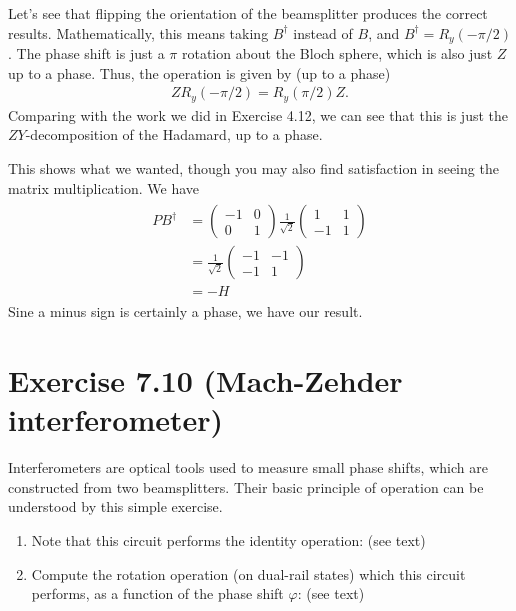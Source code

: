 \documentclass{book}
\begin{document}
    Let's see that flipping the orientation of the beamsplitter produces the correct results. Mathematically, this means taking $B^\dagger$ instead of $B$, and $B^\dagger = R_y(-\pi/2)$. The phase shift is just a $\pi$ rotation about the Bloch sphere, which is also just $Z$ up to a phase. Thus, the operation is given by (up to a phase)
    \begin{align}
        Z R_y(-\pi/2) = R_y(\pi/2) Z.
    \end{align}
    Comparing with the work we did in Exercise 4.12, we can see that this is just the $ZY$-decomposition of the Hadamard, up to a phase. 
    
    This shows what we wanted, though you may also find satisfaction in seeing the matrix multiplication. We have
    \begin{align}
    \begin{aligned}
        P B^\dagger &= \begin{pmatrix}
            -1 & 0 \\
            0 & 1
        \end{pmatrix} \frac{1}{\sqrt{2}} \begin{pmatrix}
            1 & 1 \\
            -1 & 1
        \end{pmatrix} \\[1.5ex]
        &= \frac{1}{\sqrt{2}} \begin{pmatrix}
            -1 & -1 \\
            -1 & 1
        \end{pmatrix} \\
        &= - H
    \end{aligned}
    \end{align}
    Sine a minus sign is certainly a phase, we have our result.

\section*{Exercise 7.10 (Mach-Zehder interferometer)}
    Interferometers are optical tools used to measure small phase shifts, which are constructed from two beamsplitters. Their basic principle of operation can be understood by this simple exercise.
    \begin{enumerate}
        \item Note that this circuit performs the identity operation: (see text)
        \item Compute the rotation operation (on dual-rail states) which this circuit performs, as a function of the phase shift $\varphi$: (see text)
    \end{enumerate}
    
\end{document}
